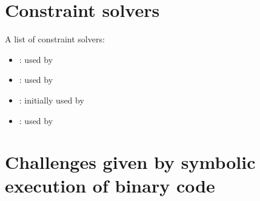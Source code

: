 \section{Constraint solvers}

A list of constraint solvers:
\begin{itemize}
  \item \cite{STP-TR07}: used by~\cite{EXE-CCS06,KLEE-OSDI08,MineSweeper-BOTNET08}
  \item \cite{Z3-TACS08}: used by~\cite{FIRMALICE-NDSS15,MAYHEM-SP12}
  \item \cite{DISSOLVER-TR03}: initially used by \cite{SAGE-NDSS08}
  \item \cite{PPL-SCP08}: used by \cite{AEG-NDSS11}
\end{itemize}

\section{Challenges given by symbolic execution of binary code}

